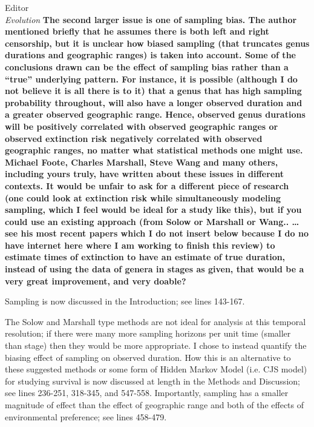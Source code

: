 \documentclass{letter}
\begin{document}
\begin{letter}{Editor \\ \textit{Evolution}}
  \textbf{The second larger issue is one of sampling bias. The author mentioned briefly that he assumes there is both left and right censorship, but it is unclear how biased sampling (that truncates genus durations and geographic ranges) is taken into account. Some of the conclusions drawn can be the effect of sampling bias rather than a “true” underlying pattern. For instance, it is possible (although I do not believe it is all there is to it) that a genus that has high sampling probability throughout, will also have a longer observed duration and a greater observed geographic range. Hence, observed genus durations will be positively correlated with observed geographic ranges or observed extinction risk negatively correlated with observed geographic ranges, no matter what statistical methods one might use. Michael Foote, Charles Marshall, Steve Wang and many others, including yours truly, have written about these issues in different contexts. It would be unfair to ask for a different piece of research (one could look at extinction risk while simultaneously modeling sampling, which I feel would be ideal for a study like this), but if you could use an existing approach (from Solow or Marshall or Wang.. …see his most recent papers which I do not insert below because I do no have internet here where I am working to finish this review) to estimate times of extinction to have an estimate of true duration, instead of using the data of genera in stages as given, that would be a very great improvement, and very doable?}

  Sampling is now discussed in the Introduction; see lines 143-167. %

  The Solow and Marshall type methods are not ideal for analysis at this temporal resolution; if there were many more sampling horizons per unit time (smaller than stage) then they would be more appropriate. I chose to instead quantify the biasing effect of sampling on observed duration. How this is an alternative to these suggested methods or some form of Hidden Markov Model (i.e. CJS model) for studying survival is now discussed at length in the Methods and Discussion; see lines 236-251, 318-345, and 547-558. Importantly, sampling has a smaller magnitude of effect than the effect of geographic range and both of the effects of environmental preference; see lines 458-479. %



\end{letter}
\end{document}
